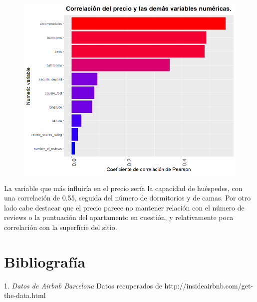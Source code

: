 \documentclass{article}
\begin{document}
\vspace{0.35cm}
\begin{figure}[h]
\hspace*{-0.15cm}
\centering
\includegraphics[scale = 0.6]{grafico_correlaciones_pearson}
\end{figure}
\vspace{0.15cm}

La variable que más influiría en el precio sería la capacidad de huéspedes, con una correlación de 0.55, seguida del número de dormitorios y de camas. Por otro lado cabe destacar que el precio parece no mantener relación con el número de reviews o la puntuación del apartamento en cuestión, y relativamente poca correlación con la superfície del sitio.


\clearpage
\section{Bibliografía}
1. \emph{Datos de Airbnb Barcelona} Datos recuperados de http://insideairbnb.com/get-the-data.html
\end{document}
